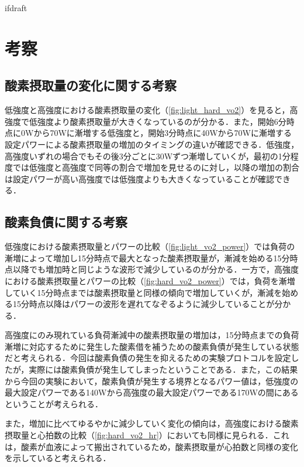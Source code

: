 \expandafter\ifx\csname ifdraft\endcsname\relax
 
\fi

\section{考察}

\subsection{酸素摂取量の変化に関する考察}

低強度と高強度における酸素摂取量の変化（\ref{fig:light_hard_vo2}）を見ると，高強度で低強度より酸素摂取量が大きくなっているのが分かる．また，開始6分時点に0Wから70Wに漸増する低強度と，開始3分時点に40Wから70Wに漸増する設定パワーによる酸素摂取量の増加のタイミングの違いが確認できる．低強度，高強度いずれの場合でもその後3分ごとに30Wずつ漸増していくが，最初の1分程度では低強度と高強度で同等の割合で増加を見せるのに対し，以降の増加の割合は設定パワーが高い高強度では低強度よりも大きくなっていることが確認できる．

\subsection{酸素負債に関する考察}

低強度における酸素摂取量とパワーの比較（\ref{fig:light_vo2_power}）では負荷の漸増によって増加し15分時点で最大となった酸素摂取量が，漸減を始める15分時点以降でも増加時と同じような波形で減少しているのが分かる．一方で，高強度における酸素摂取量とパワーの比較（\ref{fig:hard_vo2_power}）では，負荷を漸増していく15分時点までは酸素摂取量と同様の傾向で増加していくが，漸減を始める15分時点以降はパワーの波形を遅れてなぞるように減少していることが分かる．

高強度にのみ現れている負荷漸減中の酸素摂取量の増加は，15分時点までの負荷漸増に対応するために発生した酸素借を補うための酸素負債が発生している状態だと考えられる．今回は酸素負債の発生を抑えるための実験プロトコルを設定したが，実際には酸素負債が発生してしまったということである．また，この結果から今回の実験において，酸素負債が発生する境界となるパワー値は，低強度の最大設定パワーである140Wから高強度の最大設定パワーである170Wの間にあるということが考えられる．

また，増加に比べてゆるやかに減少していく変化の傾向は，高強度における酸素摂取量と心拍数の比較（\ref{fig:hard_vo2_hr}）においても同様に見られる．これは，酸素が血液によって搬出されているため，酸素摂取量が心拍数と同様の変化を示していると考えられる．

